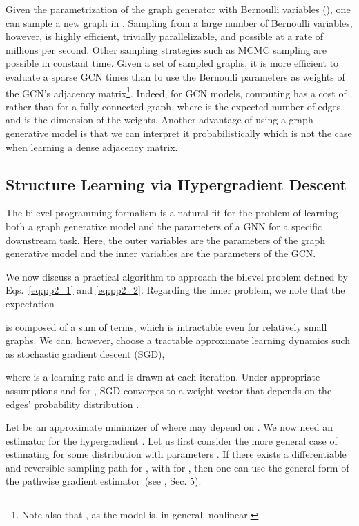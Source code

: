 \documentclass{article}
\begin{document}
	Given the parametrization of the graph generator with Bernoulli variables (), one can sample a new graph in . Sampling from a large number of Bernoulli variables, however, is highly efficient, trivially parallelizable, and possible at a rate of millions per second. Other sampling strategies such as MCMC sampling are possible in constant time.
	Given a set of sampled graphs, it is more efficient to evaluate a sparse GCN  times than to use the Bernoulli parameters as weights of the GCN's adjacency matrix\footnote{Note also that , as the model  is, in general, nonlinear.
}.
Indeed, for GCN models, computing  has a cost of , rather than  for a fully connected graph, where  is the expected number of edges, and  is the dimension of the weights. Another advantage of using a graph-generative model is that we can interpret it probabilistically which is not the case when learning a dense adjacency matrix. 
	

	\subsection{Structure Learning via Hypergradient Descent}  \label{sec:hypergrad}
	
The bilevel programming 
formalism is a natural fit for the problem of learning both a graph generative model and the parameters of a GNN for a specific downstream task. Here, the outer variables  are the parameters of the graph generative model and the inner variables  are the parameters of the GCN. 


We now discuss a practical algorithm to approach the bilevel problem defined by Eqs.~\eqref{eq:pp2_1} and \eqref{eq:pp2_2}.
Regarding the inner problem, we note that the expectation 

is composed of a sum of  terms, which is intractable even for relatively small graphs. We can, however, choose a tractable approximate learning dynamics  such as stochastic gradient descent (SGD),

where  is a learning rate and  is drawn at each iteration.
Under appropriate assumptions and for , SGD  converges 
to a weight vector  that depends on the edges' probability distribution \citep{bottou2010large}. 

Let  be an approximate minimizer of  where  may  depend on .
We now need an estimator for the hypergradient . 
Let us first consider the more general case of estimating  for some distribution  with parameters . If there exists a differentiable and reversible sampling path  for  , with  for , then one can use the general form of the pathwise gradient estimator~(see \citet{mohamed2019monte}, Sec. 5):
\end{document}
